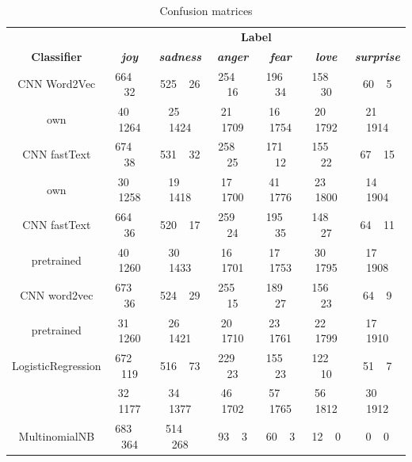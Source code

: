 \documentclass[conference]{IEEEtran}
\begin{document}
\begin{table}[htbp]
\caption{Confusion matrices}
\begin{center}
\begin{tabular}{|c|c|c|c|c|c|c|}
\hline
\textbf{}&\multicolumn{6}{|c|}{\textbf{Label}} \\ 
\cline{2-7}
\textbf{Classifier} & \textbf{\textit{joy}}& \textbf{\textit{sadness}}& \textbf{\textit{anger}}& \textbf{\textit{fear}}& \textbf{\textit{love}}& \textbf{\textit{surprise}} \\ 
\hline
CNN Word2Vec & 664$\;$$\;$$\;$$\;$  32 & 525$\;$$\;$$\;$$\;$26 & 254$\;$$\;$$\;$$\;$16 & 196$\;$$\;$$\;$$\;$34 & 158$\;$$\;$$\;$$\;$30 & 60$\;$$\;$$\;$$\;$5 \\ 

own & 40$\;$$\;$$\;$$\;$1264 & 25$\;$$\;$$\;$$\;$1424 & 21$\;$$\;$$\;$$\;$1709 & 16$\;$$\;$$\;$$\;$1754 & 20$\;$$\;$$\;$$\;$1792 & 21$\;$$\;$$\;$$\;$1914 \\ 
\hline
CNN fastText & 674$\;$$\;$$\;$$\;$38 & 531$\;$$\;$$\;$$\;$32 & 258$\;$$\;$$\;$$\;$25 & 171$\;$$\;$$\;$$\;$12 & 155$\;$$\;$$\;$$\;$22 & 67$\;$$\;$$\;$$\;$15 \\ 

own & 30$\;$$\;$$\;$$\;$1258 & 19$\;$$\;$$\;$$\;$1418 & 17$\;$$\;$$\;$$\;$1700 & 41$\;$$\;$$\;$$\;$1776 & 23$\;$$\;$$\;$$\;$1800 & 14$\;$$\;$$\;$$\;$1904 \\ 
\hline
CNN fastText & 664$\;$$\;$$\;$$\;$36 & 520$\;$$\;$$\;$$\;$17 & 259$\;$$\;$$\;$$\;$24 & 195$\;$$\;$$\;$$\;$35 & 148$\;$$\;$$\;$$\;$27 & 64$\;$$\;$$\;$$\;$11 \\ 

pretrained & 40$\;$$\;$$\;$$\;$1260 & 30$\;$$\;$$\;$$\;$1433 & 16$\;$$\;$$\;$$\;$1701 & 17$\;$$\;$$\;$$\;$1753 & 30$\;$$\;$$\;$$\;$1795 & 17$\;$$\;$$\;$$\;$1908 \\ 
\hline
CNN word2vec & 673$\;$$\;$$\;$$\;$36 & 524$\;$$\;$$\;$$\;$29 & 255$\;$$\;$$\;$$\;$15 & 189$\;$$\;$$\;$$\;$27 & 156$\;$$\;$$\;$$\;$23 & 64$\;$$\;$$\;$$\;$9 \\ 

pretrained & 31$\;$$\;$$\;$$\;$1260 & 26$\;$$\;$$\;$$\;$1421 & 20$\;$$\;$$\;$$\;$1710 & 23$\;$$\;$$\;$$\;$1761 & 22$\;$$\;$$\;$$\;$1799 & 17$\;$$\;$$\;$$\;$1910 \\ 
\hline
LogisticRegression & 672$\;$$\;$$\;$$\;$119 & 516$\;$$\;$$\;$$\;$73 & 229$\;$$\;$$\;$$\;$23 & 155$\;$$\;$$\;$$\;$23 & 122$\;$$\;$$\;$$\;$10 & 51$\;$$\;$$\;$$\;$7 \\ 

 & 32$\;$$\;$$\;$$\;$1177 & 34$\;$$\;$$\;$$\;$1377 & 46$\;$$\;$$\;$$\;$1702 & 57$\;$$\;$$\;$$\;$1765 & 56$\;$$\;$$\;$$\;$1812 & 30$\;$$\;$$\;$$\;$1912 \\ 
\hline
MultinomialNB & 683$\;$$\;$$\;$$\;$364 & 514$\;$$\;$$\;$$\;$268 & 93$\;$$\;$$\;$$\;$3 & 60$\;$$\;$$\;$$\;$3 & 12$\;$$\;$$\;$$\;$0 & 0$\;$$\;$$\;$$\;$0 \\ 


\end{tabular}
\end{center}
\end{table}
\end{document}
